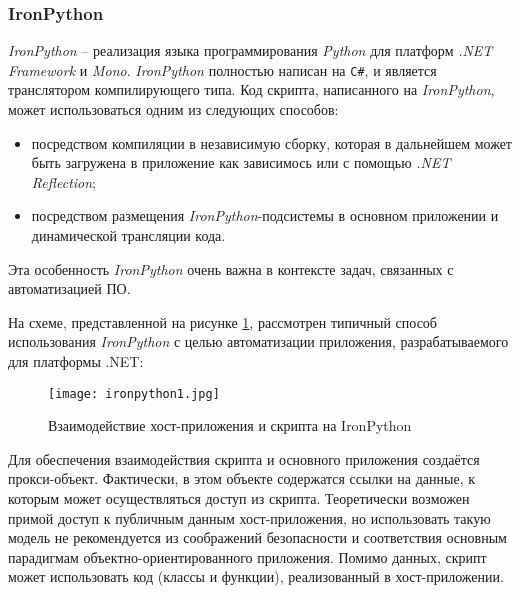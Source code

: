 \subsubsection{IronPython}

{\it IronPython} -- реализация языка программирования {\it Python} для платформ {\it .NET Framework} и {\it Mono}. {\it IronPython} полностью написан на {\tt C\#}, и является транслятором компилирующего типа. Код скрипта, написанного на {\it IronPython}, может использоваться одним из следующих способов:
\begin{itemize}
 \item посредством компиляции в независимую сборку, которая в дальнейшем может быть загружена в приложение как зависимось или с помощью {\it .NET Reflection};
 \item посредством размещения {\it IronPython}-подсистемы в основном приложении и динамической трансляции кода.
\end{itemize}

Эта особенность {\it IronPython} очень важна в контексте задач, связанных с автоматизацией ПО.

На схеме, представленной на рисунке \ref{ironpython-scheme}, рассмотрен типичный способ использования {\it IronPython} с целью автоматизации приложения, разрабатываемого для платформы .NET:

\begin{figure}[!h]
    \centering
    \texttt{[image: ironpython1.jpg]}
    \caption{Взаимодействие хост-приложения и скрипта на IronPython}
    \label{ironpython-scheme}
\end{figure}

Для обеспечения взаимодействия скрипта и основного приложения создаётся прокси-объект. Фактически, в этом объекте содержатся ссылки на данные, к которым может осуществляться доступ из скрипта. Теоретически возможен примой доступ к публичным данным хост-приложения, но использовать такую модель не рекомендуется из соображений безопасности и соответствия основным парадигмам объектно-ориентированного приложения. Помимо данных, скрипт может использовать код (классы и функции), реализованный в хост-приложении.